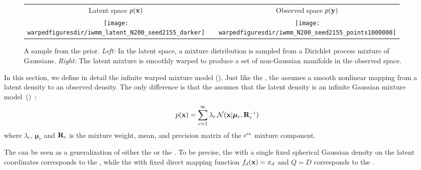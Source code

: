 \begin{figure}
\centering
\begin{tabular}{ccc}
Latent space $p({\bf{x}})$ & & Observed space $p({\bf{y}})$ \\
\fbox{\texttt{[image: \\warpedfiguresdir/iwmm\_latent\_N200\_seed2155\_darker]}} &
\raisebox{7em}{$\overset{\mathlarger{\vf(\vx)}}{\mathlarger{\mathlarger{\mathlarger{\mathlarger{\mathlarger{\mathlarger{\mathlarger{\rightarrow}}}}}}}}$} &
\fbox{\texttt{[image: \\warpedfiguresdir/iwmm\_N200\_seed2155\_points1000000]}}
\end{tabular}
\caption[A draw from the infinite warped mixture model prior]{
A sample from the \iwmm{} prior.
\emph{Left:} In the latent space, a mixture distribution is sampled from a Dirichlet process mixture of Gaussians.
\emph{Right:} The latent mixture is smoothly warped to produce a set of non-Gaussian manifolds in the observed space.}
\label{fig:generative}
\end{figure}


In this section, we define in detail the infinite warped mixture model (\iwmm{}).
Just like the \gplvm{}, the \iwmm{} assumes a smooth nonlinear mapping from a latent density to an observed density.
The only difference is that the \iwmm{} assumes that the latent density is an infinite Gaussian mixture model~(\iGMM{})~\citep{rasmussen2000infinite}:
\begin{align}
p(\vx ) = \sum_{c=1}^{\infty} \lambda_c \, {\cal N}(\vx|\bm{\mu}_{c},\vR_{c}\inv)
\end{align}
where $\lambda_{c}$, $\bm{\mu}_{c}$ and $\mathbf{R}_{c}$ is the mixture weight, mean, and precision matrix of the $c^{\text{\tiny th}}$ mixture component.

The \iwmm{} can be seen as a generalization of either the \gplvm{} or the \iGMM{}.
To be precise, the \iwmm{} with a single fixed spherical Gaussian density on the latent coordinates corresponds to the \gplvm{}, while the \iwmm{} with fixed direct mapping function $f_{d}({\bf{x}})=x_{d}$ and 
$Q=D$ corresponds to the \iGMM{}.

